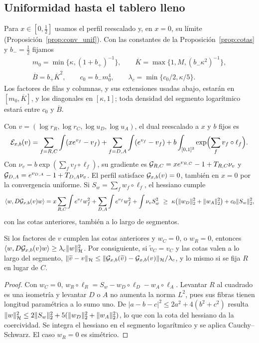 \subsection{Uniformidad hasta el tablero lleno}

Para $x\in[0,\frac12]$ usamos el perfil reescalado y, en $x=0$, su límite
(Proposición~\ref{prop:conv_unif}). Con las constantes de la Proposición~\ref{prop:cotas} y
$b_-=\frac12$ fijamos
\begin{gather*}
 m_0=\min\{\kappa,(1+b_+)^{-1}\},\qquad \overline K=\max\{1,M,(b_-\kappa^2)^{-1}\},\\
 \overline B=b_+\overline K^2,\qquad c_0=b_-m_0^4,\qquad \lambda_c=\min\{c_0/2,\kappa/5\}.
\end{gather*}
Los factores de filas y columnas, y sus extensiones usadas abajo, estarán en $[m_0,\overline K]$, y los
diagonales en $[\kappa,1]$; toda densidad del segmento logarítmico estará entre $c_0$ y $\overline B$.

Con $v=(\log r_R,\log r_C,\log u_D,\log u_A)$, el dual reescalado a $x$ y $b$ fijos es
\[
 {\mathcal{E}}_{x,b}(v)=\sum_{f=R,C}\int(xe^{v_f}-v_f)+\sum_{f=D,A}\int(e^{v_f}-v_f)
 +b\int_{[0,1]^2}\exp\Bigl(\sum_fv_f\circ\ell_f\Bigr).
\]
Con $\nu_v=b\exp(\sum_fv_f\circ\ell_f)$, su gradiente es ${\mathcal{G}}_{R,C}=xe^{v_{R,C}}-1+T_{R,C}\nu_v$ y
${\mathcal{G}}_{D,A}=e^{v_{D,A}}-1+T_{D,A}\nu_v$. El perfil satisface ${\mathcal{G}}_{x,b}(v)=0$, también en $x=0$ por la
convergencia uniforme. Si $S_w=\sum_fw_f\circ\ell_f$, el hessiano cumple
\[
 \langle w,D{\mathcal{G}}_{x,b}(v)w\rangle=x\sum_{R,C}\int e^{v_f}w_f^2+\sum_{D,A}\int e^{v_f}w_f^2+\int\nu_vS_w^2
 \ \ge\ \kappa\bigl(\|w_D\|_2^2+\|w_A\|_2^2\bigr)+c_0\|S_w\|_2^2 ,
\]
con las cotas anteriores, también a lo largo de segmentos.

\begin{lema}\label{lem:coercividad}
Si los factores de $v$ cumplen las cotas anteriores y $w_C=0$, o $w_R=0$, entonces $\langle w,D{\mathcal{G}}_{x,b}(v)w\rangle\ge\lambda_c\|w\|_{\mathcal{H}}^2$. Por
consiguiente, si $\widetilde v_C=v_C$ y las cotas valen a lo largo del segmento,
$\|\widetilde v-v\|_{\mathcal{H}}\le\|{\mathcal{G}}_{x,b}(\widetilde v)-{\mathcal{G}}_{x,b}(v)\|_{\mathcal{H}}/\lambda_c$, y lo mismo si se fija $R$
en lugar de $C$.
\end{lema}

\begin{proof}
Con $w_C=0$, $w_R\circ\ell_R=S_w-w_D\circ\ell_D-w_A\circ\ell_A$. Levantar $R$ al cuadrado es una
isometría y levantar $D$ o $A$ no aumenta la norma $L^2$, pues sus fibras tienen longitud paramétrica a
lo sumo uno. De $|a-b-c|^2\le2a^2+4(b^2+c^2)$ resulta
$\|w\|_{\mathcal{H}}^2\le2\|S_w\|_2^2+5(\|w_D\|_2^2+\|w_A\|_2^2)$, lo que con la cota del hessiano da la
coercividad. Se integra el hessiano en el segmento logarítmico y se aplica Cauchy--Schwarz. El caso
$w_R=0$ es simétrico.
\end{proof}

